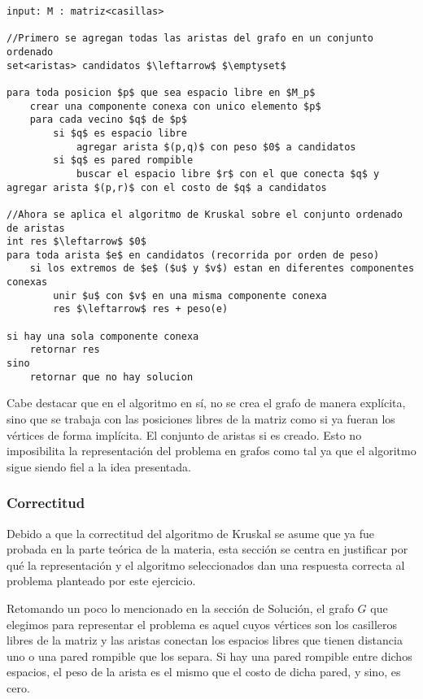\begin{lstlisting}
input: M : matriz<casillas>

//Primero se agregan todas las aristas del grafo en un conjunto ordenado
set<aristas> candidatos $\leftarrow$ $\emptyset$

para toda posicion $p$ que sea espacio libre en $M_p$
	crear una componente conexa con unico elemento $p$
	para cada vecino $q$ de $p$
		si $q$ es espacio libre
			agregar arista $(p,q)$ con peso $0$ a candidatos
		si $q$ es pared rompible
			buscar el espacio libre $r$ con el que conecta $q$ y agregar arista $(p,r)$ con el costo de $q$ a candidatos

//Ahora se aplica el algoritmo de Kruskal sobre el conjunto ordenado de aristas
int res $\leftarrow$ $0$
para toda arista $e$ en candidatos (recorrida por orden de peso)
	si los extremos de $e$ ($u$ y $v$) estan en diferentes componentes conexas
		unir $u$ con $v$ en una misma componente conexa
		res $\leftarrow$ res + peso(e)

si hay una sola componente conexa
	retornar res
sino
	retornar que no hay solucion
\end{lstlisting}

Cabe destacar que en el algoritmo en sí, no se crea el grafo de manera explícita, sino que se trabaja con las posiciones libres de la matriz como si ya fueran los vértices de forma implícita. El conjunto de aristas si es creado. Esto no imposibilita la representación del problema en grafos como tal ya que el algoritmo sigue siendo fiel a la idea presentada.

\subsubsection{Correctitud}

Debido a que la correctitud del algoritmo de Kruskal se asume que ya fue probada en la parte teórica de la materia, esta sección se centra en justificar por qué la representación y el algoritmo seleccionados dan una respuesta correcta al problema planteado por este ejercicio.

Retomando un poco lo mencionado en la sección de Solución, el grafo $G$ que elegimos para representar el problema es aquel cuyos vértices son los casilleros libres de la matriz y las aristas conectan los espacios libres que tienen distancia uno o una pared rompible que los separa. Si hay una pared rompible entre dichos espacios, el peso de la arista es el mismo que el costo de dicha pared, y sino, es cero.


